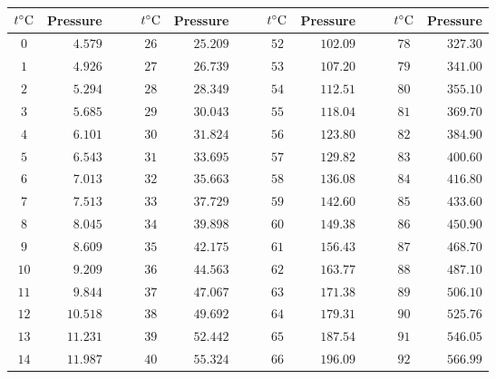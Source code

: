 \begin{tabular}{crcccrcccrcccr}                                                                        \toprule
${t}^{\circ}\textrm{C}$ & Pressure &&& ${t}^{\circ}\textrm{C}$ & Pressure &&& ${t}^{\circ}\textrm{C}$ & Pressure &&& ${t}^{\circ}\textrm{C}$ & Pressure \\\midrule
$0$           & $4.579$  &&& $26$          & $25.209$ &&& $52$          & $102.09$ &&& $78$          & $327.30$ \\[4pt]
$1$           & $4.926$  &&& $27$          & $26.739$ &&& $53$          & $107.20$ &&& $79$          & $341.00$ \\[4pt]
$2$           & $5.294$  &&& $28$          & $28.349$ &&& $54$          & $112.51$ &&& $80$          & $355.10$ \\[4pt]
$3$           & $5.685$  &&& $29$          & $30.043$ &&& $55$          & $118.04$ &&& $81$          & $369.70$ \\[4pt]
$4$           & $6.101$  &&& $30$          & $31.824$ &&& $56$          & $123.80$ &&& $82$          & $384.90$ \\[4pt]
$5$           & $6.543$  &&& $31$          & $33.695$ &&& $57$          & $129.82$ &&& $83$          & $400.60$ \\[4pt]
$6$           & $7.013$  &&& $32$          & $35.663$ &&& $58$          & $136.08$ &&& $84$          & $416.80$ \\[4pt]
$7$           & $7.513$  &&& $33$          & $37.729$ &&& $59$          & $142.60$ &&& $85$          & $433.60$ \\[4pt]
$8$           & $8.045$  &&& $34$          & $39.898$ &&& $60$          & $149.38$ &&& $86$          & $450.90$ \\[4pt]
$9$           & $8.609$  &&& $35$          & $42.175$ &&& $61$          & $156.43$ &&& $87$          & $468.70$ \\[4pt]
$10$          & $9.209$  &&& $36$          & $44.563$ &&& $62$          & $163.77$ &&& $88$          & $487.10$ \\[4pt]
$11$          & $9.844$  &&& $37$          & $47.067$ &&& $63$          & $171.38$ &&& $89$          & $506.10$ \\[4pt]
$12$          & $10.518$ &&& $38$          & $49.692$ &&& $64$          & $179.31$ &&& $90$          & $525.76$ \\[4pt]
$13$          & $11.231$ &&& $39$          & $52.442$ &&& $65$          & $187.54$ &&& $91$          & $546.05$ \\[4pt]
$14$          & $11.987$ &&& $40$          & $55.324$ &&& $66$          & $196.09$ &&& $92$          & $566.99$ \\[4pt]

\end{tabular}
